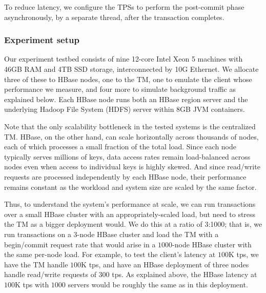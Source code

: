 To reduce latency, we configure the TPSs to perform the post-commit phase asynchronously, 
by a separate thread, after the transaction completes.


\subsubsection{Experiment setup}

Our experiment testbed consists of nine 12-core Intel Xeon 5 machines with 46GB RAM and 4TB 
SSD storage, interconnected by 10G Ethernet. We allocate three of these to HBase nodes, 
one to the TM, one to emulate the client whose performance we measure, and four more to simulate 
background traffic as explained below. Each HBase node runs both an HBase region server and 
the underlying Hadoop File System (HDFS) server within 8GB JVM containers. 

Note that the only scalability bottleneck in the tested systems is the centralized TM.
HBase, on the other hand, can scale horizontally across thousands of nodes, each of which processes a small fraction of the total load. 
Since each node typically serves millions of  keys, data access rates remain load-balanced across nodes 
even when access to individual keys is highly skewed.  And since read/write requests are processed independently by each HBase node, 
their performance remains constant as the workload and  system size are scaled by the same factor. 

Thus, to understand the system's performance at scale, 
we can run transactions over a small HBase cluster with an appropriately-scaled load, 
but need to stress the TM as a bigger deployment would. 
We do this at a ratio of 3:1000; that is, we run transactions on a $3$-node HBase cluster and 
load the TM with a begin/commit request rate that would arise in a $1000$-node HBase cluster with the same per-node load.
For example, to test the client's latency at $100$K tps, we have the TM handle $100$K tps, and have  an HBase deployment of
three nodes handle read/write requests of $300$ tps. As explained above, 
the HBase latency at $100$K tps with $1000$ servers would be roughly the same as in this deployment.

